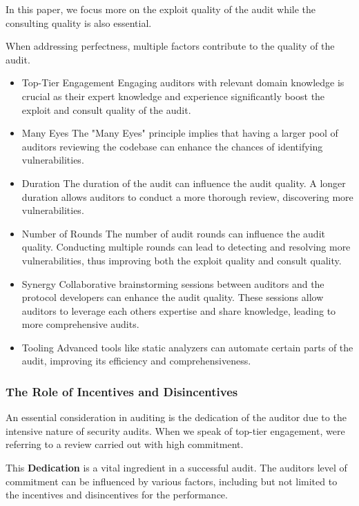 \documentclass[10pt]{extarticle}
\begin{document}
In this paper, we focus more on the exploit quality of the audit while
the consulting quality is also essential.

When addressing perfectness, multiple factors contribute to the quality
of the audit.

\begin{itemize}
\item
  Top-Tier Engagement Engaging auditors with relevant domain knowledge
  is crucial as their expert knowledge and experience significantly
  boost the exploit and consult quality of the audit.
\item
  Many Eyes The "Many Eyes" principle implies that having a larger pool
  of auditors reviewing the codebase can enhance the chances of
  identifying vulnerabilities.
\item
  Duration The duration of the audit can influence the audit quality. A
  longer duration allows auditors to conduct a more thorough review,
  discovering more vulnerabilities.
\item
  Number of Rounds The number of audit rounds can influence the audit
  quality. Conducting multiple rounds can lead to detecting and
  resolving more vulnerabilities, thus improving both the exploit
  quality and consult quality.
\item
  Synergy Collaborative brainstorming sessions between auditors and the
  protocol developers can enhance the audit quality. These sessions
  allow auditors to leverage each other\textquotesingle s expertise and
  share knowledge, leading to more comprehensive audits.
\item
  Tooling Advanced tools like static analyzers can automate certain
  parts of the audit, improving its efficiency and comprehensiveness.
\end{itemize}

\subsubsection*{The Role of Incentives and
Disincentives}\label{the-role-of-incentives-and-disincentives}

An essential consideration in auditing is the dedication of the auditor
due to the intensive nature of security audits. When we speak of
top-tier engagement, we\textquotesingle re referring to a review carried
out with high commitment.

This \textbf{Dedication} is a vital ingredient in a successful audit.
The auditor\textquotesingle s level of commitment can be influenced by
various factors, including but not limited to the incentives and
disincentives for the performance.
\end{document}
